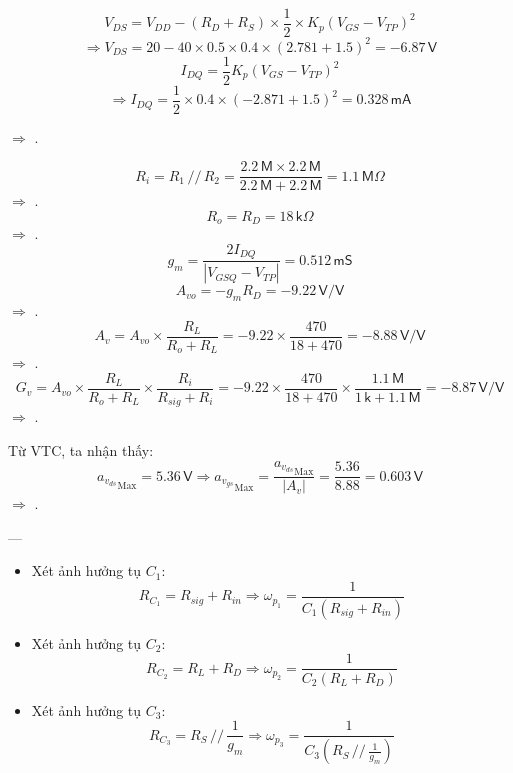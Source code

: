 \[
V_{DS}=V_{DD}-\left(R_{D}+R_{S}\right)\times\frac{1}{2}\times K_{p}\left(V_{GS}-V_{TP}\right)^{2}
\]
\[
\Rightarrow V_{DS}=20-40\times0.5\times0.4\times\left(2.781+1.5\right)^{2}=-6.87\,\textsf{V}
\]
\[
I_{DQ}=\frac{1}{2}K_{p}\left(V_{GS}-V_{TP}\right)^{2}
\]
\[
\Rightarrow I_{DQ}=\frac{1}{2}\times0.4\times\left(-2.871+1.5\right)^{2}=0.328\,\textsf{mA}
\]

$\Rightarrow$ .


\[
R_{i}=R_{1}\,//\,R_{2}=\frac{2.2\,\textsf{M}\times2.2\,\textsf{M}}{2.2\,\textsf{M}+2.2\,\textsf{M}}=1.1\,\textsf{M}\Omega
\]
$\Rightarrow$ .
\[
R_{o}=R_{D}=18\,\textsf{k}\Omega
\]
$\Rightarrow$ .
\[
g_{m}=\frac{2I_{DQ}}{\left|V_{GSQ}-V_{TP}\right|}=0.512\,\textsf{mS}
\]
\[
A_{vo}=-g_{m}R_{D}=-9.22\,\textsf{V/V}
\]
$\Rightarrow$ .
\[
A_{v}=A_{vo}\times\frac{R_{L}}{R_{o}+R_{L}}=-9.22\times\frac{470}{18+470}=-8.88\,\textsf{V/V}
\]
$\Rightarrow$ .
\[
G_{v}=A_{vo}\times\frac{R_{L}}{R_{o}+R_{L}}\times\frac{R_{i}}{R_{sig}+R_{i}}=-9.22\times\frac{470}{18+470}\times\frac{1.1\,\textsf{M}}{1\,\textsf{k}+1.1\,\textsf{M}}=-8.87\,\textsf{V/V}
\]
$\Rightarrow$ .


Từ VTC, ta nhận thấy:
\[
{a_{v_{ds}}}_{\text{Max}}=5.36\,\textsf{V}
\Rightarrow {a_{v_{gs}}}_{\text{Max}}=\frac{{a_{v_{ds}}}_{\text{Max}}}{\left|A_{v}\right|}=\frac{5.36}{8.88}=0.603\,\textsf{V}
\]
$\Rightarrow$ .

---


\begin{itemize}[label=-]
	\item Xét ảnh hưởng tụ $C_{1}$: 
	\[
	R_{C_{1}}=R_{sig}+R_{in}
	\Longrightarrow \omega_{p_{1}}=\frac{1}{C_{1}\left(R_{sig}+R_{in}\right)}
	\]
	
	\item Xét ảnh hưởng tụ $C_{2}$: 
	\[
	R_{C_{2}}=R_{L}+R_{D}
	\Longrightarrow \omega_{p_{2}}=\frac{1}{C_{2}\left(R_{L}+R_{D}\right)}
	\]
	
	\item Xét ảnh hưởng tụ $C_{3}$: 
	\[
	R_{C_{3}}=R_{S}\,//\,\frac{1}{g_{m}}
	\Longrightarrow \omega_{p_{3}}=\frac{1}{C_{3}\left(R_{S}\,//\,\frac{1}{g_{m}}\right)}
	\]
\end{itemize}

